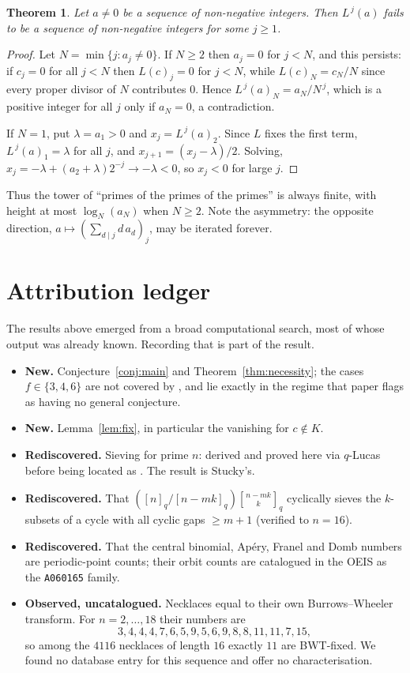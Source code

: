 \documentclass[11pt,a4paper]{article}
\theoremstyle{plain}
\newtheorem{theorem}{Theorem}[section]
\theoremstyle{definition}
\theoremstyle{remark}
\newcommand{\qint}[1]{[#1]_q}
\newcommand{\qbin}[2]{\genfrac[]{0pt}{}{#1}{#2}_{q}}
\begin{document}
\begin{theorem}\label{thm:tower}
Let $a\ne0$ be a sequence of non-negative integers. Then $L^{\,j}(a)$ fails to be a sequence
of non-negative integers for some $j\ge1$.
\end{theorem}

\begin{proof}
Let $N=\min\{j: a_j\ne0\}$. If $N\ge2$ then $a_j=0$ for $j<N$, and this persists: if
$c_j=0$ for all $j<N$ then $L(c)_j=0$ for $j<N$, while $L(c)_N=c_N/N$ since every proper
divisor of $N$ contributes $0$. Hence $L^{\,j}(a)_N=a_N/N^{\,j}$, which is a positive
integer for all $j$ only if $a_N=0$, a contradiction.

If $N=1$, put $\lambda=a_1>0$ and $x_j=L^{\,j}(a)_2$. Since $L$ fixes the first term,
$L^{\,j}(a)_1=\lambda$ for all $j$, and $x_{j+1}=(x_j-\lambda)/2$. Solving,
$x_j=-\lambda+(a_2+\lambda)2^{-j}\to-\lambda<0$, so $x_j<0$ for large $j$.
\end{proof}

Thus the tower of ``primes of the primes of the primes'' is always finite, with height at
most $\log_N(a_N)$ when $N\ge2$. Note the asymmetry: the opposite direction,
$a\mapsto(\sum_{d\mid j}d\,a_d)_j$, may be iterated forever.

\section{Attribution ledger}\label{app:ledger}

The results above emerged from a broad computational search, most of whose output was
already known. Recording that is part of the result.

\begin{itemize}
  \item \textbf{New.} Conjecture~\ref{conj:main} and Theorem~\ref{thm:necessity}; the cases
        $f\in\{3,4,6\}$ are not covered by \cite{stucky}, and lie exactly in the regime that
        paper flags as having no general conjecture.
  \item \textbf{New.} Lemma~\ref{lem:fix}, in particular the vanishing for $c\notin K$.
  \item \textbf{Rediscovered.} Sieving for prime $n$: derived and proved here via $q$-Lucas
        before being located as \cite[Cor.~3.3]{stucky}. The result is Stucky's.
  \item \textbf{Rediscovered.} That
        $(\qint{n}/\qint{n-mk})\qbin{n-mk}{k}$ cyclically sieves the $k$-subsets of a cycle
        with all cyclic gaps $\ge m+1$ (verified to $n=16$).
  \item \textbf{Rediscovered.} That the central binomial, Ap\'ery, Franel and Domb numbers
        are periodic-point counts; their orbit counts are catalogued in the OEIS as the
        \texttt{A060165} family.
  \item \textbf{Observed, uncatalogued.} Necklaces equal to their own Burrows--Wheeler
        transform. For $n=2,\dots,18$ their numbers are
        \[3,4,4,4,7,6,5,9,5,6,9,8,8,11,11,7,15,\]
        so among the $4116$ necklaces of length $16$ exactly $11$ are BWT-fixed. We found no
        database entry for this sequence and offer no characterisation.
\end{itemize}
\end{document}
